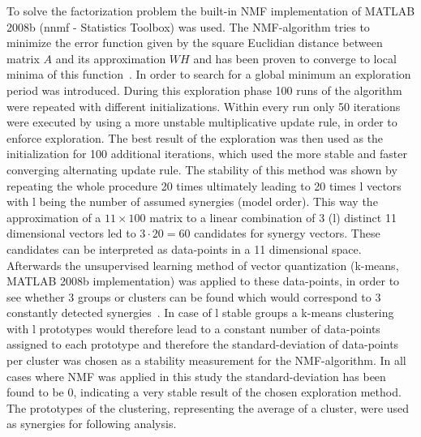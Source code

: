 To solve the factorization problem the built-in NMF implementation of MATLAB 2008b (nnmf - Statistics Toolbox) was used. The NMF-algorithm tries to minimize the error function given by the square Euclidian distance between matrix $A$ and its approximation $WH$ and has been proven to converge to local minima of this function~\citet{Lee:2001p1638}. In order to search for a global minimum an exploration period was introduced. During this exploration phase 100 runs of the algorithm were repeated with different initializations. Within every run only 50 iterations were executed by using a more unstable multiplicative update rule, in order to enforce exploration. The best result of the exploration was then used as the initialization for 100 additional iterations, which used the more stable and faster converging alternating update rule. The stability of this method was shown by repeating the whole procedure 20 times ultimately leading to 20 times l vectors with l being the number of assumed synergies (model order). This way the approximation of a $11 \times 100$ matrix to a linear combination of 3 (l) distinct 11 dimensional vectors led to $3 \cdot 20 = 60$ candidates for synergy vectors. These candidates can be interpreted as data-points in a 11 dimensional space. Afterwards the unsupervised learning method of vector quantization (k-means, MATLAB 2008b implementation) was applied to these data-points, in order to see whether 3 groups or clusters can be found which would correspond to 3 constantly detected synergies~. In case of l stable groups a k-means clustering with l prototypes would therefore lead to a constant number of data-points assigned to each prototype and therefore the standard-deviation of data-points per cluster was chosen as a stability measurement for the NMF-algorithm. In all cases where NMF was applied in this study the standard-deviation has been found to be 0, indicating a very stable result of the chosen exploration method. The prototypes of the clustering, representing the average of a cluster, were used as synergies for following analysis.
